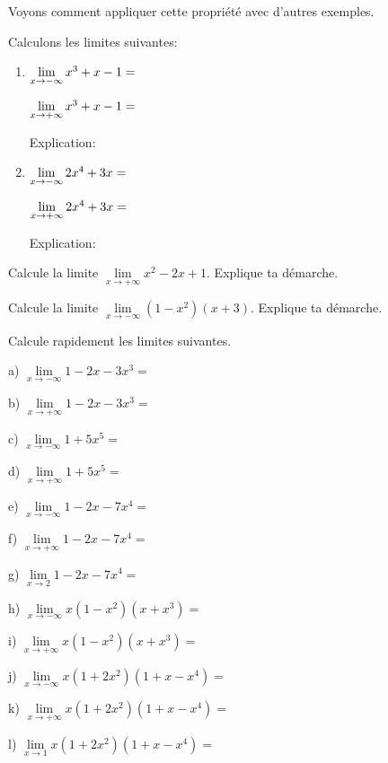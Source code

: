 \documentclass[a4paper,12pt]{report}
\newcommand{\pinf}{+\infty}
\newcommand{\minf}{-\infty}
\begin{document}
Voyons comment appliquer cette propriété avec d'autres exemples.

\begin{exemple}
Calculons les limites suivantes:

\begin{enumerate}
\item \(\lim\limits_{x\to\minf}x^3+x-1=\dotfill\)

\(\lim\limits_{x\to\pinf}x^3+x-1=\dotfill\)

Explication:\vspace{3cm}
\item \(\lim\limits_{x\to\minf}2x^4+3x=\dotfill\)

\(\lim\limits_{x\to\pinf}2x^4+3x=\dotfill\)

Explication:\vspace{3cm}
\end{enumerate}
\end{exemple}

\begin{exercice}
Calcule la limite \(\lim\limits_{x\to\pinf}x^2-2x+1\). Explique ta démarche.
\end{exercice}

\begin{exercice}
Calcule la limite \(\lim\limits_{x\to\minf}(1-x^2)(x+3)\). Explique ta démarche.
\end{exercice}

\begin{exercice}
Calcule rapidement les limites suivantes.
\par \setlength{\columnseprule}{0 pt}
          \begin{minipage}[t]{\linewidth}
          \begin{multicols}{2}
a) \(\lim\limits_{x\to\minf}1-2x-3x^3=\) \dotfill

b) \(\lim\limits_{x\to\pinf}1-2x-3x^3=\) \dotfill

c) \(\lim\limits_{x\to\minf}1+5x^5=\) \dotfill

d) \(\lim\limits_{x\to\pinf}1+5x^5=\) \dotfill

e) \(\lim\limits_{x\to\minf}1-2x-7x^4=\) \dotfill

f) \(\lim\limits_{x\to\pinf}1-2x-7x^4=\) \dotfill

g) \(\lim\limits_{x\to 2}1-2x-7x^4=\) \dotfill

h) \(\lim\limits_{x\to\minf}x(1-x^2)(x+x^3)=\) \dotfill

i) \(\lim\limits_{x\to\pinf}x(1-x^2)(x+x^3)=\) \dotfill

j) \(\lim\limits_{x\to\minf}x(1+2x^2)(1+x-x^4)=\) \dotfill

k) \(\lim\limits_{x\to\pinf}x(1+2x^2)(1+x-x^4)=\) \dotfill

l) \(\lim\limits_{x\to 1}x(1+2x^2)(1+x-x^4)=\) \dotfill


\end{multicols}\end{minipage}
\end{exercice}
\end{document}
